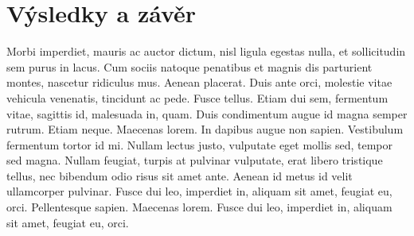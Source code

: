 \section{Výsledky a závěr}
Morbi imperdiet, mauris ac auctor dictum, nisl ligula egestas nulla, et sollicitudin sem purus in lacus. Cum sociis natoque penatibus et magnis dis parturient montes, nascetur ridiculus mus. Aenean placerat. Duis ante orci, molestie vitae vehicula venenatis, tincidunt ac pede. Fusce tellus. Etiam dui sem, fermentum vitae, sagittis id, malesuada in, quam. Duis condimentum augue id magna semper rutrum. Etiam neque. Maecenas lorem. In dapibus augue non sapien. Vestibulum fermentum tortor id mi. Nullam lectus justo, vulputate eget mollis sed, tempor sed magna. Nullam feugiat, turpis at pulvinar vulputate, erat libero tristique tellus, nec bibendum odio risus sit amet ante. Aenean id metus id velit ullamcorper pulvinar. Fusce dui leo, imperdiet in, aliquam sit amet, feugiat eu, orci. Pellentesque sapien. Maecenas lorem. Fusce dui leo, imperdiet in, aliquam sit amet, feugiat eu, orci.
